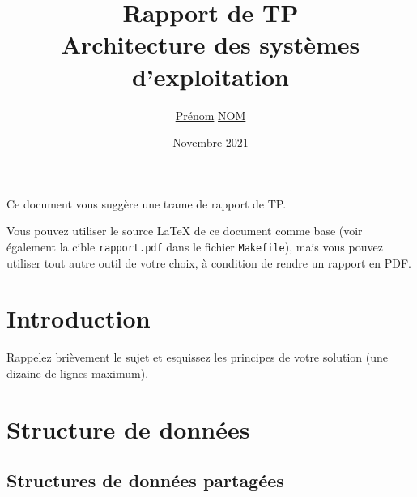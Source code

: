 \documentclass[a4paper]{article}
\title{Rapport de TP \\ Architecture des systèmes d'exploitation}
\author{\underline{Prénom} \underline{NOM}}
\date{Novembre 2021}
\makeatletter
\newenvironment{expl}{%
  \begin{list}{}{%
      \small\itshape%
      \topsep\z@%
      \listparindent0pt%
      \parsep0.75\baselineskip%
      \setlength{\leftmargin}{20mm}%
      \setlength{\rightmargin}{20mm}%
    }
  \item[]}%
  {\end{list}}
\makeatother
\begin{document}
\maketitle


\begin{expl}
  Ce document vous suggère une trame de rapport de TP.

  Vous pouvez utiliser le source \LaTeX{} de ce document comme
  base (voir également la cible \texttt{rapport.pdf} dans le fichier
  \texttt{Makefile}), mais vous pouvez utiliser tout autre outil
  de votre choix, à condition de rendre un rapport en PDF.
\end{expl}

\section{Introduction}

\begin{expl}
  Rappelez brièvement le sujet et esquissez les principes de votre
  solution (une dizaine de lignes maximum).
\end{expl}

\section{Structure de données}

\subsection{Structures de données partagées}\label{sec-shm}
\end{document}
